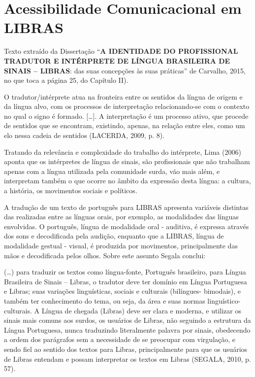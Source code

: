 \documentclass[
	12pt,				%
	openright,			%
  oneside,     %
	a4paper,			%
	chapter=TITLE,		%
	english,			%
	french,				%
	spanish,			%
	brazil				%
	]{abntex2}
\begin{document}
\section{Acessibilidade Comunicacional em LIBRAS}

Texto extraído da Dissertação “\textbf{A IDENTIDADE DO PROFISSIONAL TRADUTOR E INTÉRPRETE DE LÍNGUA BRASILEIRA DE SINAIS – LIBRAS}: das suas concepções às suas práticas” de Carvalho, 2015, no que toca a página 25, do Capítulo II).

\begin{citacao}
    O tradutor/intérprete atua na fronteira entre os sentidos da língua de origem e da língua alvo, com os processos de interpretação relacionando-se com o contexto no qual o signo é formado. [\ldots]. A interpretação é um processo ativo, que procede de sentidos que se encontram, existindo, apenas, na relação entre eles, como um elo nessa cadeia de sentidos (LACERDA, 2009, p. 8).
\end{citacao}

Tratando da relevância e complexidade do trabalho do intérprete, Lima (2006) aponta que os intérpretes de língua de sinais, são profissionais que não trabalham apenas com a língua utilizada pela comunidade surda, vão mais além, e interpretam também o que ocorre no âmbito da expressão desta língua: a cultura, a história, os movimentos sociais e políticos.

A tradução de um texto de português para LIBRAS apresenta variáveis distintas das realizadas entre as línguas orais, por exemplo, as modalidades das línguas envolvidas. O português, língua de modalidade oral - auditiva, é expressa através dos sons e decodificada pela audição, enquanto que a LIBRAS, língua de modalidade gestual - visual, é produzida por movimentos, principalmente das mãos e decodificada pelos olhos. Sobre este assunto Segala conclui:

\begin{citacao}
    (\ldots) para traduzir os textos como língua-fonte, Português brasileiro, para Língua Brasileira de Sinais – Libras, o tradutor deve ter domínio em Língua Portuguesa e Libras; suas variações linguísticas, sociais e culturais (bilíngues- bimodais), e também ter conhecimento do tema, ou seja, da área e suas normas linguístico- culturais. A Língua de chegada (Libras) deve ser clara e moderna, e utilizar os sinais mais comuns aos surdos, os usuários de Libras, não seguindo a estrutura da Língua Portuguesa, nunca traduzindo literalmente palavra por sinais, obedecendo a ordem dos parágrafos sem a necessidade de se preocupar com virgulação, e sendo fiel ao sentido dos textos para Libras, principalmente para que os usuários de Libras entendam e possam interpretar os textos em Libras (SEGALA, 2010, p. 57).
\end{citacao}
\end{document}
